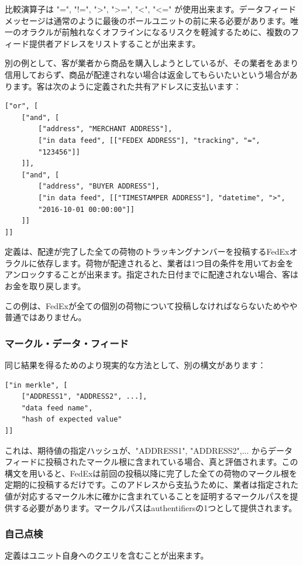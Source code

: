 \documentclass[a4paper, dvipdfmx]{jsarticle}
\begin{document}
比較演算子は "=", "!=", ">", ">=", "<", "<=" が使用出来ます。データフィードメッセージは通常のように最後のボールユニットの前に来る必要があります。唯一のオラクルが前触れなくオフラインになるリスクを軽減するために、複数のフィード提供者アドレスをリストすることが出来ます。

別の例として、客が業者から商品を購入しようとしているが、その業者をあまり信用しておらず、商品が配達されない場合は返金してもらいたいという場合があります。客は次のように定義された共有アドレスに支払います：

\begin{lstlisting}[basicstyle=\ttfamily\footnotesize, frame=none]
["or", [
    ["and", [
        ["address", "MERCHANT ADDRESS"],
        ["in data feed", [["FEDEX ADDRESS"], "tracking", "=",
        "123456"]]
    ]],
    ["and", [
        ["address", "BUYER ADDRESS"],
        ["in data feed", [["TIMESTAMPER ADDRESS"], "datetime", ">",
        "2016-10-01 00:00:00"]]
    ]]
]]
\end{lstlisting}

\noindent 定義は、配達が完了した全ての荷物のトラッキングナンバーを投稿するFedExオラクルに依存します。荷物が配達されると、業者は1つ目の条件を用いてお金をアンロックすることが出来ます。指定された日付までに配達されない場合、客はお金を取り戻します。

この例は、FedExが全ての個別の荷物について投稿しなければならないためやや普通ではありません。

\subsubsection{マークル・データ・フィード}
同じ結果を得るためのより現実的な方法として、別の構文があります：

\begin{lstlisting}[basicstyle=\ttfamily\footnotesize, frame=none]
["in merkle", [
    ["ADDRESS1", "ADDRESS2", ...],
    "data feed name",
    "hash of expected value"
]]
\end{lstlisting}

これは、期待値の指定ハッシュが、"ADDRESS1", "ADDRESS2",... からデータフィードに投稿されたマークル根に含まれている場合、真と評価されます。この構文を用いると、FedExは前回の投稿以降に完了した全ての荷物のマークル根を定期的に投稿するだけです。このアドレスから支払うために、業者は指定された値が対応するマークル木に確かに含まれていることを証明するマークルパスを提供する必要があります。マークルパスはauthentifiersの1つとして提供されます。


\subsubsection{自己点検}
定義はユニット自身へのクエリを含むことが出来ます。
\end{document}
